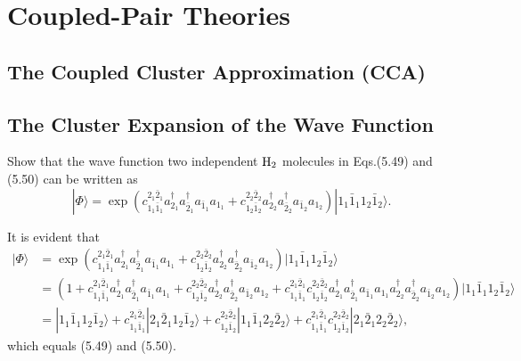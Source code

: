 \documentclass[a4paper]{book}
\newcounter{exercise}[chapter]
\newcounter{solution}[chapter]
\begin{document}
	\section{Coupled-Pair Theories}
	
	\subsection{The Coupled Cluster Approximation (CCA)}
	
	\subsection{The Cluster Expansion of the Wave Function}

	\begin{exercise}
	Show that the wave function two independent $\ce{H2}$ molecules in Eqs.(5.49) and (5.50) can be written as
	\[
		| \Phi \rangle = \exp{( c^{2_1 \bar{2}_1}_{1_1 \bar{1}_1} a^\dagger_{2_1} a^\dagger_{\bar{2}_1} a_{\bar{1}_1} a_{1_1} + c^{2_2 \bar{2}_2}_{1_2 \bar{1}_2} a^\dagger_{2_2} a^\dagger_{\bar{2}_2} a_{\bar{1}_2} a_{1_2} )} | 1_1 \bar{1}_1 1_2 \bar{1}_2 \rangle.
	\]
	\end{exercise}
	
	\begin{solution}
	It is evident that
	\begin{align*}
		| \Phi \rangle &= \exp( c^{ 2_1 \bar{2}_1}_{ 1_1 \bar{1}_1 } a^\dagger_{2_1} a^\dagger_{\bar{2}_1} a_{\bar{1}_1} a_{1_1} + c^{ 2_2 \bar{2}_2 }_{ 1_2 \bar{1}_2 } a^\dagger_{2_2} a^\dagger_{\bar{2}_2} a_{\bar{1}_2} a_{1_2} ) | 1_1 \bar{1}_1 1_2 \bar{1}_2 \rangle \\
		&= ( 1 + c^{ 2_1 \bar{2}_1}_{ 1_1 \bar{1}_1 } a^\dagger_{2_1} a^\dagger_{\bar{2}_1} a_{\bar{1}_1} a_{1_1} + c^{ 2_2 \bar{2}_2 }_{ 1_2 \bar{1}_2 } a^\dagger_{2_2} a^\dagger_{\bar{2}_2} a_{\bar{1}_2} a_{1_2} + c^{ 2_1 \bar{2}_1}_{ 1_1 \bar{1}_1 } c^{ 2_2 \bar{2}_2 }_{ 1_2 \bar{1}_2 } a^\dagger_{2_1} a^\dagger_{\bar{2}_1} a_{\bar{1}_1} a_{1_1}  a^\dagger_{2_2} a^\dagger_{\bar{2}_2} a_{\bar{1}_2} a_{1_2} ) | 1_1 \bar{1}_1 1_2 \bar{1}_2 \rangle \\
		&= | 1_1 \bar{1}_1 1_2 \bar{1}_2 \rangle + c^{ 2_1 \bar{2}_1}_{ 1_1 \bar{1}_1 } | 2_1 \bar{2}_1 1_2 \bar{1}_2 \rangle + c^{ 2_2 \bar{2}_2 }_{ 1_2 \bar{1}_2 } | 1_1 \bar{1}_1 2_2 \bar{2}_2 \rangle +  c^{ 2_1 \bar{2}_1}_{ 1_1 \bar{1}_1 } c^{ 2_2 \bar{2}_2 }_{ 1_2 \bar{1}_2 } | 2_1 \bar{2}_1 2_2 \bar{2}_2 \rangle,
	\end{align*}
	which equals (5.49) and (5.50). 
			
	\end{solution}
	
\end{document}
